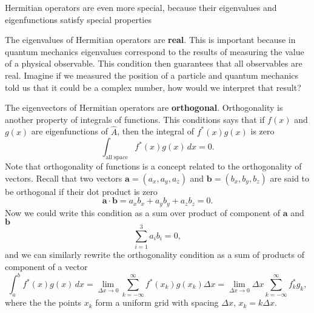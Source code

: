 \documentclass[../Main/chem331-notes.tex]{subfiles}
\begin{document}
Hermitian operators are even more special, because their eigenvalues and eigenfunctions satisfy special properties
\begin{ibox}
\begin{myitems}
\item The eigenvalues of Hermitian operators are \textbf{real}. This is important because in quantum mechanics eigenvalues correspond to the results of measuring the value of a physical observable. This condition then guarantees that all observables are real. Imagine if we measured the position of a particle and quantum mechanics told us that it could be a complex number, how would we interpret that result?
\item The eigenvectors of Hermitian operators are \textbf{orthogonal}. Orthogonality is another property of integrals of functions. This conditions says that if $f(x)$ and $g(x)$ are eigenfunctions of $\hat{A}$, then the integral of $f^*(x)g(x)$ is zero
\begin{equation}
\int_\text{all space} f^*(x) g(x) \, dx = 0.
\end{equation}
Note that orthogonality of functions is a concept related to the orthogonality of vectors. Recall that two vectors $\mathbf{a} = (a_x, a_y, a_z)$ and $\mathbf{b} = (b_x, b_y, b_z)$ are said to be orthogonal if their dot product is zero
\begin{equation}
\mathbf{a} \cdot \mathbf{b} = a_x b_x + a_y b_y + a_z b_z = 0.
\end{equation}
Now we could write this condition as a sum over product of component of $\mathbf{a}$ and $\mathbf{b}$
\begin{equation}
\sum_{i = 1}^{3} a_i b_i = 0,
\end{equation}
and we can similarly rewrite the orthogonality condition as a sum of products of component of a vector
\begin{equation}
\int_a^b f^*(x) g(x) \, dx = \lim_{\Delta x \rightarrow 0} \sum_{k = -\infty}^{\infty} f^*(x_k) g(x_k) \Delta x
=\lim_{\Delta x \rightarrow 0}  \Delta x \sum_{k = -\infty}^{\infty} f^*_k g_k,
\end{equation}
where the the points $x_k$ form a uniform grid with spacing $\Delta x$, $x_k = k  \Delta x$.

\end{myitems}
\end{ibox}
\end{document}

